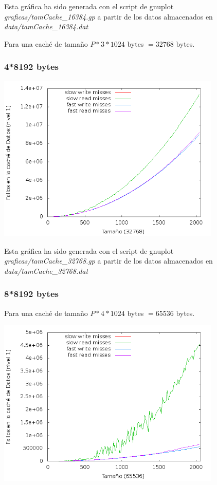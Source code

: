 \documentclass[nochap]{apuntes}
\begin{document}
Esta gráfica ha sido generada con el script de gnuplot \emph{graficas/tamCache\_16384.gp} a partir de los datos almacenados en \emph{data/tamCache\_16384.dat}

Para una caché de tamaño $P*3*1024$ bytes $= 32768 $ bytes.
\subsubsection{4*8192 bytes}

\begin{center}
\includegraphics[width=0.8\textwidth]{graficas/fotos/Cache_32768.png}
\end{center}

Esta gráfica ha sido generada con el script de gnuplot \emph{graficas/tamCache\_32768.gp} a partir de los datos almacenados en \emph{data/tamCache\_32768.dat}

\subsubsection{8*8192 bytes}
Para una caché de tamaño $P*4*1024$ bytes $= 65536 $ bytes.

\begin{center}
\includegraphics[width=0.8\textwidth]{graficas/fotos/Cache_65536.png}
\end{center}
\end{document}
